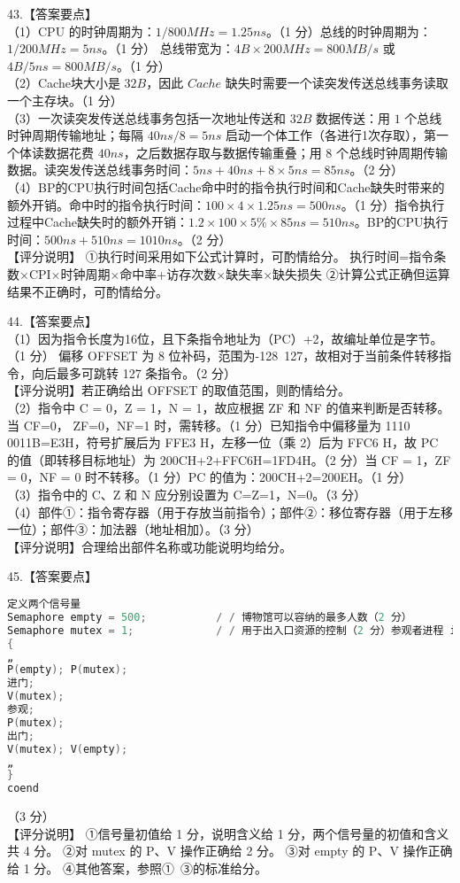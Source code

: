 43.【答案要点】 \\
（1）CPU 的时钟周期为：$1/800MHz = 1.25ns$。（1 分）总线的时钟周期为：$1/200MHz = 5ns$。（1 分） 
总线带宽为：$4B\times200MHz = 800MB/s$ 或 $4B/5ns = 800MB/s$。（1 分） \\
（2）Cache块大小是 $32B$，因此 $Cache$ 缺失时需要一个读突发传送总线事务读取一个主存块。（1 分）  \\
（3）一次读突发传送总线事务包括一次地址传送和 $32B$ 数据传送：用 $1$ 个总线时钟周期传输地址；每隔 $40ns/8 = 5ns$ 启动一个体工作（各进行1次存取），第一个体读数据花费 $40ns$，之后数据存取与数据传输重叠；用 $8$ 个总线时钟周期传输数据。读突发传送总线事务时间：$5ns + 40ns + 8\times5ns = 85ns$。（2 分） \\
（4）BP的CPU执行时间包括Cache命中时的指令执行时间和Cache缺失时带来的额外开销。命中时的指令执行时间：$100\times4\times1.25ns = 500ns$。（1 分）指令执行过程中Cache缺失时的额外开销：$1.2\times100\times5\%\times85ns = 510ns$。BP的CPU执行时间：$500ns + 510ns = 1010ns$。（2 分） \\
【评分说明】
①执行时间采用如下公式计算时，可酌情给分。 执行时间=指令条数×CPI×时钟周期×命中率+访存次数×缺失率×缺失损失 
②计算公式正确但运算结果不正确时，可酌情给分。 

44.【答案要点】 \\
（1）因为指令长度为16位，且下条指令地址为（PC）+2，故编址单位是字节。（1 分） 偏移 OFFSET 为 8 位补码，范围为-128~127，故相对于当前条件转移指令，向后最多可跳转 127 条指令。（2 分）  \\
【评分说明】若正确给出 OFFSET 的取值范围，则酌情给分。  \\
（2）指令中 C = 0，Z = 1，N = 1，故应根据 ZF 和 NF 的值来判断是否转移。当 CF=0， ZF=0，NF=1 时，需转移。（1 分）已知指令中偏移量为 1110 0011B=E3H，符号扩展后为 FFE3 H，左移一位（乘 2）后为 FFC6 H，故 PC 的值（即转移目标地址）为 200CH+2+FFC6H=1FD4H。（2 分）当 CF = 1，ZF = 0，NF = 0 时不转移。（1 分）PC 的值为：200CH+2=200EH。（1 分）  \\
（3）指令中的 C、Z 和 N 应分别设置为 C=Z=1，N=0。（3 分）  \\
（4）部件①：指令寄存器（用于存放当前指令）；部件②：移位寄存器（用于左移一位）；部件③：加法器（地址相加）。（3 分）  \\
【评分说明】合理给出部件名称或功能说明均给分。

45.【答案要点】 \\
\begin{lstlisting}[language=cpp]
定义两个信号量
Semaphore empty = 500;           / / 博物馆可以容纳的最多人数（2 分） 
Semaphore mutex = 1;             / / 用于出入口资源的控制（2 分）参观者进程 i; 
{  
„ 
P(empty); P(mutex); 
进门; 
V(mutex);
参观; 
P(mutex); 
出门; 
V(mutex); V(empty);
„ 
} 
coend
\end{lstlisting}
（3 分） \\
【评分说明】 
①信号量初值给 1 分，说明含义给 1 分，两个信号量的初值和含义共 4 分。 
②对 mutex 的 P、V 操作正确给 2 分。 
③对 empty 的 P、V 操作正确给 1 分。 
④其他答案，参照①~③的标准给分。

